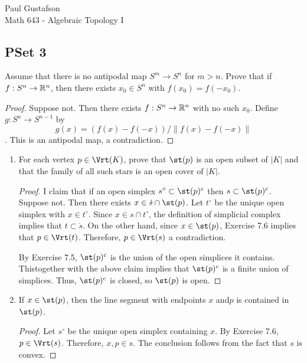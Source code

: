\documentclass{article}
\begin{document}
\noindent Paul Gustafson\\
\noindent Math 643 - Algebraic Topology I


\subsection*{PSet 3}
 Assume that there is no antipodal map $S^m \to S^n$ for $m > n$. Prove
 that if $f: S^n \to \mathbb{R}^n$, then there exists $x_0 \in S^n$ with $f(x_0) = f(-x_0)$.
\begin{proof}
Suppose not. Then there exists $f:S^n \to \mathbb{R}^n$ with no such $x_0$. Define $g: S^n \to S^{n-1}$ by
$$g(x) = (f(x) - f(-x))/\|f(x) - f(-x)\|$$.
This is an antipodal map, a contradiction.
\end{proof}

\begin{enumerate}
\item For each vertex $p \in \Vrt(K)$, prove that $\st(p)$ is an open subset of $|K|$ and that the family of all such stars is an open cover of $|K|$.
\begin{proof}
I claim that if an open simplex $s^\circ \subset \st(p)^c$ then $s \subset \st(p)^c$. Suppose not.  Then there exists $x \in \dot s \cap \st(p)$. Let $t^\circ$ be the unique open simplex with $x \in t^\circ$. Since $x \in s \cap t^\circ$, the definition of simplicial complex implies that $t \subset \dot s$. On the other hand, since $x \in \st(p)$, Exercise 7.6 implies that $p \in \Vrt(t)$. Therefore, $p \in \Vrt(s)$ a contradiction.

By Exercise 7.5, $\st(p)^c$ is the union of the open simplices it contains. Thistogether with the above claim implies that $\st(p)^c$ is a finite union of simplices. Thus, $\st(p)^c$ is closed, so $\st(p)$ is open.
\end{proof}

\item If $x \in \st(p)$, then the line segment with endpoints $x$ and$p$ is contained in $\st(p)$.
\begin{proof}
Let $s^\circ$ be the unique open simplex containing $x$.  By Exercise 7.6, $p \in \Vrt(s)$. Therefore, $x,p \in s$. The conclusion follows from the fact that $s$ is convex.
\end{proof}
\end{enumerate}
\end{document}
